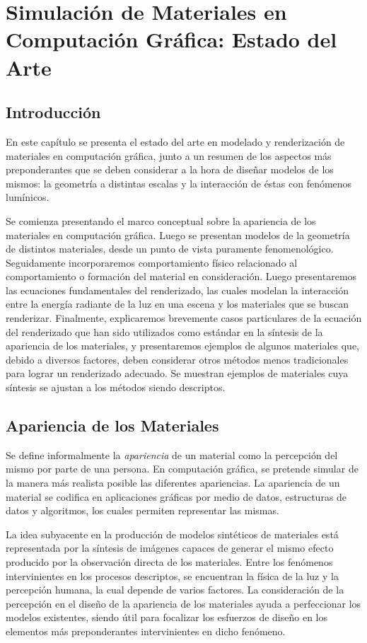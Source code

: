 
\chapter[Estado del Arte]{Simulación de Materiales en Computación Gráfica: Estado del Arte}
\section{Introducción} %

En este capítulo se presenta el estado del arte en modelado y renderización de materiales en computación gráfica, junto a un resumen de los aspectos más preponderantes que se deben considerar a la hora de diseñar modelos de los mismos: la geometría a distintas escalas y la  interacción de éstas con fenómenos lumínicos.

Se comienza presentando el marco conceptual sobre la apariencia de los materiales en computación gráfica.
Luego se presentan modelos de la geometría de distintos materiales, desde un punto de vista puramente fenomenológico.
Seguidamente incorporaremos comportamiento físico relacionado al comportamiento o formación del material en consideración.
Luego presentaremos las ecuaciones fundamentales del renderizado, las cuales modelan la interacción entre la energía radiante de la luz en una escena y los materiales que se buscan renderizar.
Finalmente, explicaremos brevemente casos particulares de la ecuación del renderizado que han sido utilizados como estándar en la síntesis de la apariencia de los materiales, y presentaremos ejemplos de algunos materiales que, debido a diversos factores, deben considerar otros métodos menos tradicionales para lograr un renderizado adecuado.
Se muestran ejemplos de materiales cuya síntesis se ajustan a los métodos 
siendo descriptos.

\section{Apariencia de los Materiales}
Se define informalmente la {\em apariencia} de un material como la percepción del mismo por parte de una persona.
En computación gráfica, se pretende simular de la manera más realista posible las diferentes apariencias.
La apariencia de un material se codifica en aplicaciones gráficas por medio de datos, estructuras de datos y algoritmos, los cuales permiten representar las mismas.

La idea subyacente en la producción de modelos sintéticos de materiales está representada por la síntesis de imágenes capaces de generar el mismo efecto producido por la observación directa de los materiales.
Entre los fenómenos intervinientes en los procesos descriptos, se encuentran la física de la luz y la percepción humana, la cual depende de varios factores.
La consideración de la percepción en el diseño de la apariencia de los materiales ayuda a perfeccionar los modelos existentes, siendo útil para focalizar los esfuerzos de diseño en los elementos más preponderantes intervinientes en dicho fenómeno.
 


